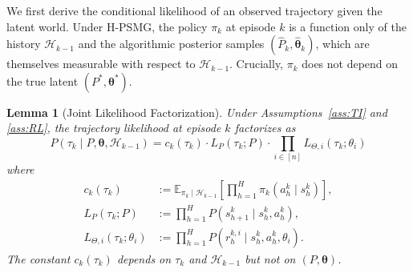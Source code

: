 \documentclass{article}
\newtheorem{lemma}[theorem]{Lemma}
\begin{document}
We first derive the conditional likelihood of an observed trajectory given the latent world. Under H-PSMG, the policy $\pi_k$ at episode $k$ is a function only of the history $\mathcal{H}_{k-1}$ and the algorithmic posterior samples $(\hat{P}_k, \hat{\boldsymbol{\theta}}_k)$, which are themselves measurable with respect to $\mathcal{H}_{k-1}$. Crucially, $\pi_k$ does not depend on the true latent $(P^*, \boldsymbol{\theta}^*)$.

\begin{lemma}[Joint Likelihood Factorization]
\label{lem:likelihood}
Under Assumptions~\ref{ass:TI} and \ref{ass:RL}, the trajectory likelihood at episode $k$ factorizes as
\begin{equation}
\label{eq:lik-factor}
P(\tau_k \mid P, \boldsymbol{\theta}, \mathcal{H}_{k-1}) = c_k(\tau_k) \cdot L_P(\tau_k; P) \cdot \prod_{i \in [n]} L_{\Theta,i}(\tau_k; \theta_i)
\end{equation}
where
\begin{align}
c_k(\tau_k) &:= \mathbb{E}_{\pi_k \mid \mathcal{H}_{k-1}}\left[\prod_{h=1}^H \pi_k(a_h^k \mid s_h^k)\right], \label{eq:ck} \\
L_P(\tau_k; P) &:= \prod_{h=1}^H P(s_{h+1}^k \mid s_h^k, a_h^k), \label{eq:lp} \\
L_{\Theta,i}(\tau_k; \theta_i) &:= \prod_{h=1}^H P(r_h^{k,i} \mid s_h^k, a_h^k, \theta_i). \label{eq:ltheta}
\end{align}
The constant $c_k(\tau_k)$ depends on $\tau_k$ and $\mathcal{H}_{k-1}$ but not on $(P, \boldsymbol{\theta})$.
\end{lemma}
\end{document}
